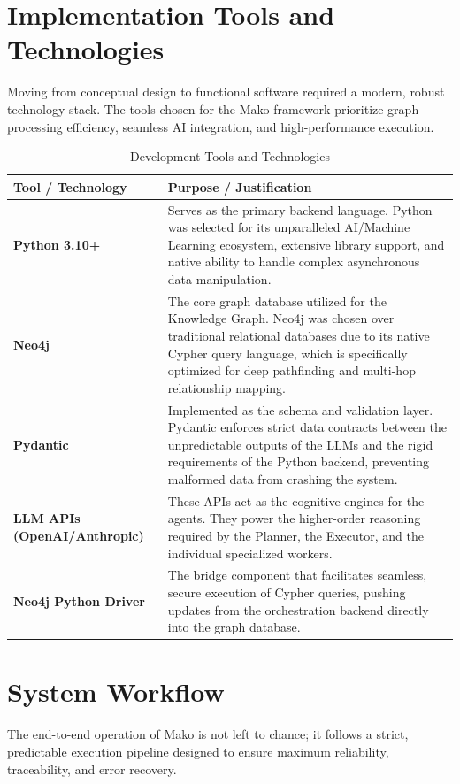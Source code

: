 \section{Implementation Tools and Technologies}
Moving from conceptual design to functional software required a modern, robust technology stack. The tools chosen for the Mako framework prioritize graph processing efficiency, seamless AI integration, and high-performance execution.

\begin{table}[ht!]
    \centering
    \caption{Development Tools and Technologies}
    \label{tab:tools_technologies}
    \begin{tabular}{|p{}|p{}|}
        \hline
        \textbf{Tool / Technology} & \textbf{Purpose / Justification} \\
        \hline
        \textbf{Python 3.10+} & Serves as the primary backend language. Python was selected for its unparalleled AI/Machine Learning ecosystem, extensive library support, and native ability to handle complex asynchronous data manipulation. \\
        \hline
        \textbf{Neo4j} & The core graph database utilized for the Knowledge Graph. Neo4j was chosen over traditional relational databases due to its native Cypher query language, which is specifically optimized for deep pathfinding and multi-hop relationship mapping. \\
        \hline
        \textbf{Pydantic} & Implemented as the schema and validation layer. Pydantic enforces strict data contracts between the unpredictable outputs of the LLMs and the rigid requirements of the Python backend, preventing malformed data from crashing the system. \\
        \hline
        \textbf{LLM APIs (OpenAI/Anthropic)} & These APIs act as the cognitive engines for the agents. They power the higher-order reasoning required by the Planner, the Executor, and the individual specialized workers. \\
        \hline
        \textbf{Neo4j Python Driver} & The bridge component that facilitates seamless, secure execution of Cypher queries, pushing updates from the orchestration backend directly into the graph database. \\
        \hline
    \end{tabular}
\end{table}

\section{System Workflow}
The end-to-end operation of Mako is not left to chance; it follows a strict, predictable execution pipeline designed to ensure maximum reliability, traceability, and error recovery.

